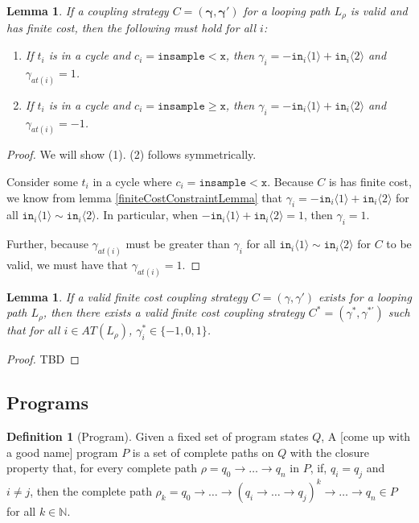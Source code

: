\documentclass[12pt]{article}
\newcommand{\NN}{\mathbb{N}}
\newcommand{\gguard}[1][x]{\texttt{insample}\geq #1}
\newcommand{\lguard}[1][x]{\texttt{insample} < #1}
\newcommand{\brangle}[1]{\langle #1 \rangle}
\newtheorem{lemma}[thm]{Lemma}
\theoremstyle{definition}
\newtheorem{defn}[thm]{Definition}
\begin{document}
\begin{lemma}\label{cycleGammaConstraints}
    If a coupling strategy $C=(\mathbf{\gamma}, \mathbf{\gamma}')$ for a looping path $L_\rho$ is valid and has finite cost, then the following must hold for all $i$:
    \begin{enumerate}
        \item If $t_i$ is in a cycle and $c_i = \lguard[\texttt{x}]$, then $\gamma_i = -\texttt{in}_i\brangle{1}+\texttt{in}_i\brangle{2}$ and $\gamma_{at(i)} = 1$.
        \item If $t_i$ is in a cycle and $c_i = \gguard[\texttt{x}]$, then $\gamma_i = -\texttt{in}_i\brangle{1}+\texttt{in}_i\brangle{2}$ and $\gamma_{at(i)} = -1$.
    \end{enumerate}
\end{lemma}
\begin{proof}
    We will show (1). (2) follows symmetrically.

    Consider some $t_i$ in a cycle where $c_i = \lguard[\texttt{x}]$. Because $C$ is has finite cost, we know from lemma \ref{finiteCostConstraintLemma} that $\gamma_i = -\texttt{in}_i\brangle{1}+\texttt{in}_i\brangle{2}$ for all  $\texttt{in}_i\brangle{1}\sim\texttt{in}_i\brangle{2}$. In particular, when $-\texttt{in}_i\brangle{1}+\texttt{in}_i\brangle{2}=1$, then $\gamma_i=1$. 
    
    Further, because $\gamma_{at(i)}$ must be greater than $\gamma_i$ for all $\texttt{in}_i\brangle{1}\sim\texttt{in}_i\brangle{2}$ for $C$ to be valid, we must have that $\gamma_{at(i)}=1$.
\end{proof}
\begin{lemma}
    If a valid finite cost coupling strategy $C = (\gamma, \gamma')$ exists for a looping path $L_\rho$, then there exists a valid finite cost coupling strategy $C^*= (\gamma^*, \gamma^{*\prime})$ such that for all $i\in AT(L_\rho)$, $\gamma_i^*\in \{-1, 0, 1\}$. 
\end{lemma}
\begin{proof}
    TBD
\end{proof}

\subsection{Programs}

\begin{defn}[Program]
    Given a fixed set of program states $Q$, A [come up with a good name] program $P$ is a set of complete paths on $Q$ with the closure property that, for every complete path $\rho = q_0\to \ldots \to q_n$ in $P$, if, $q_i = q_j$ and $i\neq j$, then the complete path $\rho_k = q_0\to \ldots \to (q_i \to \ldots \to q_j)^k \to \ldots \to q_n\in P$ for all $k\in \NN$. 
\end{defn}
\end{document}
